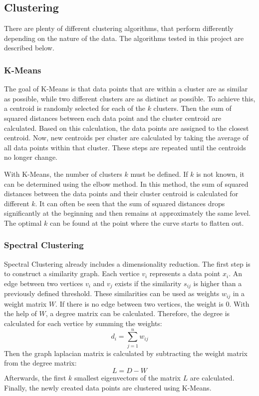 \subsection{Clustering}
There are plenty of different clustering algorithms, that perform differently depending on the nature of the data.
The algorithms tested in this project are described below.

\subsubsection{K-Means}
The goal of K-Means is that data points that are within a cluster are as similar as possible, while two different clusters are as distinct as possible.
To achieve this, a centroid is randomly selected for each of the $k$ clusters.
Then the sum of squared distances between each data point and the cluster centroid are calculated.
Based on this calculation, the data points are assigned to the closest centroid.
Now, new centroids per cluster are calculated by taking the average of all data points within that cluster.
These steps are repeated until the centroids no longer change.\cite{kmeans}

With K-Means, the number of clusters $k$ must be defined. If $k$ is not known, it can be determined using the elbow method.
In this method, the sum of squared distances between the data points and their cluster centroid is calculated for different $k$.
It can often be seen that the sum of squared distances drops significantly at the beginning and then remains at approximately the same level.
The optimal $k$ can be found at the point where the curve starts to flatten out.\cite{kmeans}

\subsubsection{Spectral Clustering}
Spectral Clustering already includes a dimensionality reduction.
The first step is to construct a similarity graph.
Each vertice $v_i$ represents a data point $x_i$.
An edge between two vertices $v_i$ and $v_j$ exists if the similarity $s_{ij}$ is higher than a previously defined threshold.
These similarities can be used as weights $w_{ij}$ in a weight matrix $W$.
If there is no edge between two vertices, the weight is $0$.
With the help of $W$, a degree matrix can be calculated.
Therefore, the degree is calculated for each vertice by summing the weights:
$$
d_i = \sum_{j=1}^n{w_{ij}}
$$
Then the graph laplacian matrix is calculated by subtracting the weight matrix from the degree matrix:
$$
L = D - W
$$
Afterwards, the first $k$ smallest eigenvectors of the matrix $L$ are calculated.
Finally, the newly created data points are clustered using K-Means.\cite{spectral_clustering}

